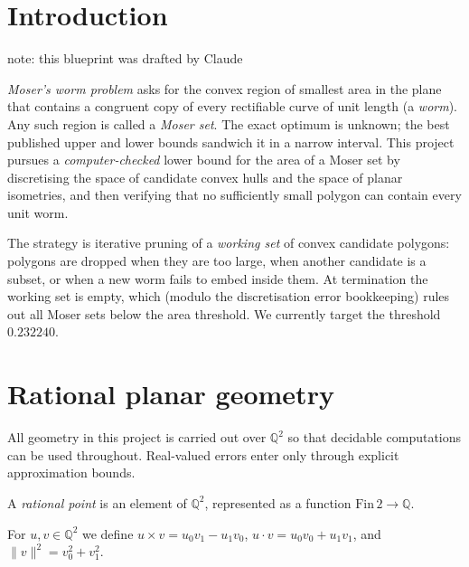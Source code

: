 



\chapter{Introduction}

note: this blueprint was drafted by Claude

\emph{Moser's worm problem} asks for the convex region of smallest area in
the plane that contains a congruent copy of every rectifiable curve of unit
length (a \emph{worm}). Any such region is called a \emph{Moser set}. The
exact optimum is unknown; the best published upper and lower bounds sandwich
it in a narrow interval. This project pursues a \emph{computer-checked}
lower bound for the area of a Moser set by discretising the space of
candidate convex hulls and the space of planar isometries, and then
verifying that no sufficiently small polygon can contain every unit worm.

The strategy is iterative pruning of a \emph{working set} of convex
candidate polygons: polygons are dropped when they are too large, when
another candidate is a subset, or when a new worm fails to embed inside
them. At termination the working set is empty, which (modulo the
discretisation error bookkeeping) rules out all Moser sets below the area
threshold. We currently target the threshold $0.232240$.

\chapter{Rational planar geometry}

All geometry in this project is carried out over $\mathbb{Q}^2$ so that
decidable computations can be used throughout. Real-valued errors enter
only through explicit approximation bounds.

\begin{definition}
  \label{def:rational-point}
  \leanok
  A \emph{rational point} is an element of $\mathbb{Q}^2$, represented as a
  function $\mathrm{Fin}\,2 \to \mathbb{Q}$.
\end{definition}

\begin{definition}
  \label{def:rational-ops}
  \leanok
  For $u, v \in \mathbb{Q}^2$ we define
  $u \times v = u_0 v_1 - u_1 v_0$,
  $u \cdot v = u_0 v_0 + u_1 v_1$, and
  $\lVert v\rVert^2 = v_0^2 + v_1^2$.
\end{definition}

